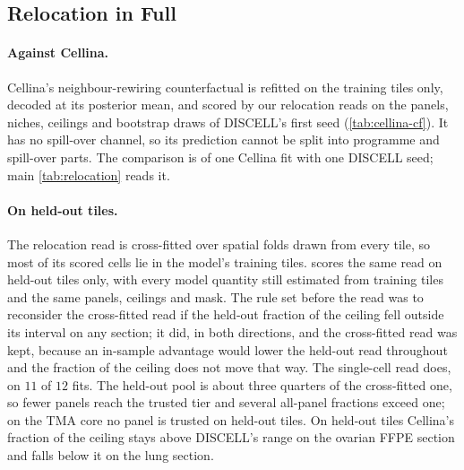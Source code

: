 \subsection{Relocation in Full}
\label{app:cellina-cf}

\paragraph{Against Cellina.} Cellina's neighbour-rewiring counterfactual \citep{moeed2026cellina} is refitted on the training tiles only, decoded at its posterior mean, and scored by our relocation reads on the panels, niches, ceilings and bootstrap draws of DISCELL's first seed (\cref{tab:cellina-cf}). It has no spill-over channel, so its prediction cannot be split into programme and spill-over parts. The comparison is of one Cellina fit with one DISCELL seed; main \cref{tab:relocation} reads it.



\paragraph{On held-out tiles.} The relocation read is cross-fitted over spatial folds drawn from every tile, so most of its scored cells lie in the model's training tiles.  scores the same read on held-out tiles only, with every model quantity still estimated from training tiles and the same panels, ceilings and mask. The rule set before the read was to reconsider the cross-fitted read if the held-out fraction of the ceiling fell outside its interval on any section; it did, in both directions, and the cross-fitted read was kept, because an in-sample advantage would lower the held-out read throughout and the fraction of the ceiling does not move that way. The single-cell read does, on $11$ of $12$ fits. The held-out pool is about three quarters of the cross-fitted one, so fewer panels reach the trusted tier and several all-panel fractions exceed one; on the TMA core no panel is trusted on held-out tiles. On held-out tiles Cellina's fraction of the ceiling stays above DISCELL's range on the ovarian FFPE section and falls below it on the lung section.



